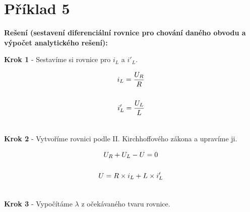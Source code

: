 \section{Příklad 5}

\vspace{1cm}
\large{\textbf{Rešení (sestavení diferenciální rovnice pro chování daného obvodu a výpočet analytického rešení):}}
\vspace{0.5cm}

\begin{center}
\textbf{Krok 1} - Sestavíme si rovnice pro $i_L$ a $i'_L$. \\
\end{center}
\vspace{-0.5cm}

\begin{gather*}
i_L = \frac{U_R}{R}\\\\
\newline
\newline
i'_L = \frac{U_L}{L}\\\\
\end{gather*}

\begin{center}
\textbf{Krok 2} - Vytvoříme rovnici podle II. Kirchhoffového zákona a upravíme ji. \\
\end{center}
\vspace{-0.5cm}

\begin{gather*}
U_R + U_L - U = 0\\\\
\newline
\newline
U = R \times i_L + L \times i'_L\\\\
\end{gather*}

\newpage

\begin{center}
\textbf{Krok 3} - Vypočítáme $\lambda$ z očekávaného tvaru rovnice. \\
\end{center}
\vspace{-0.5cm}

